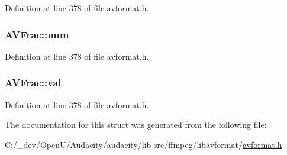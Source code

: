 Definition at line 378 of file avformat.\+h.

\subsubsection[{\texorpdfstring{num}{num}}]{ A\+V\+Frac\+::num}\hypertarget{struct_a_v_frac_a9203429f247637d5819f1feb05c47009}{}\label{struct_a_v_frac_a9203429f247637d5819f1feb05c47009}


Definition at line 378 of file avformat.\+h.

\subsubsection[{\texorpdfstring{val}{val}}]{ A\+V\+Frac\+::val}\hypertarget{struct_a_v_frac_ad8a9fbef2ecee98544521815af4bb4b1}{}\label{struct_a_v_frac_ad8a9fbef2ecee98544521815af4bb4b1}


Definition at line 378 of file avformat.\+h.



The documentation for this struct was generated from the following file\+:\begin{DoxyCompactItemize}
\item 
C\+:/\+\_\+dev/\+Open\+U/\+Audacity/audacity/lib-\/src/ffmpeg/libavformat/\hyperlink{avformat_8h}{avformat.\+h}\end{DoxyCompactItemize}
